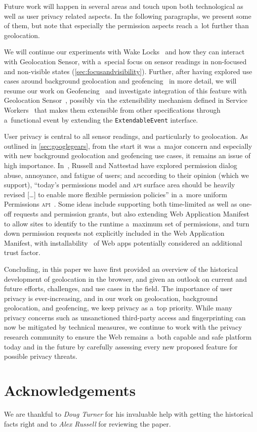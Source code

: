 \documentclass[sigconf,hyphens]{acmart}
\begin{document}
Future work will happen in several areas and touch upon both technological
as well as user privacy related aspects.
In the following paragraphs, we present some of them,
but note that especially the permission aspects reach a~lot further than geolocation.

We will continue our experiments with Wake Locks~\cite{steiner2018wakelock}
and how they can interact with Geolocation Sensor,
with a~special focus on sensor readings in non-focused and non-visible states
(\autoref{sec:focusandvisibility}).
Further, after having explored use cases around background geolocation
and geofencing~\cite{kostiainen2018geolocation} in more detail,
we will resume our work on Geofencing~\cite{kruisselbrink2017geofencing}
and investigate integration of this feature with Geolocation
Sensor~\cite{kostiainen2018geolocation}, possibly via the extensibility mechanism defined in Service
Workers~\cite{russell2017serviceworkers}
that makes them extensible from other specifications through a~functional event
by extending the \texttt{ExtendableEvent} interface.

User privacy is central to all sensor readings, and particularly to geolocation.
As outlined in \autoref{sec:googlegears}, from the start it was a~major concern
and especially with new background geolocation and geofencing use cases,
it remains an issue of high importance.
In~\cite{russell2018permissions}, Russell and Nattestad have explored permission dialog
abuse, annoyance, and fatigue of users; and according to their opinion (which we support),
``today's permissions model and \textsc{api} surface area should be heavily revised
[\ldots] to enable more flexible permission policies'' in a~more uniform
Permissions \textsc{api}~\cite{lamouri2017permissions}.
Some ideas include supporting both time-limited as well as one-off requests and permission grants,
but also extending Web Application Manifest~\cite{caceres2018manifest}
to allow sites to identify to the runtime a~maximum set of permissions,
and turn down permission requests not explicitly included in the Web Application Manifest,
with installability~\cite{caceres2018manifest} of Web apps potentially considered an additional
trust factor.

Concluding, in this paper we have first provided an overview
of the historical development of geolocation in the browser,
and given an outlook on current and future efforts, challenges, and use cases in the field.
The importance of user privacy is ever-increasing, and in our work on geolocation,
background geolocation, and geofencing,
we keep privacy as a~top priority.
While many privacy concerns such as unsanctioned third-party access and fingerprinting
can now be mitigated by technical measures, we continue to work with the privacy research community
to ensure the Web remains a~both capable and safe platform today and in the future
by carefully assessing every new proposed feature for possible privacy threats.

\section*{Acknowledgements}

We are thankful to \textit{Doug Turner} for his invaluable help
with getting the historical facts right and to \textit{Alex Russell} for reviewing the paper.


\balance 

\end{document}
